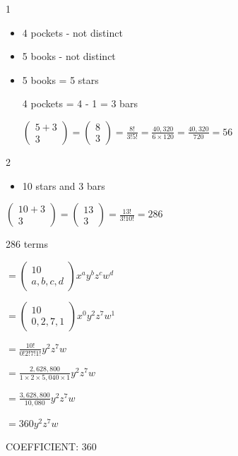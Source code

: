\documentclass[12 pt]{article}
\begin{document}
    \begin{exercise}{1}
    \hfill

    \begin{itemize}
        \item 4 pockets - not distinct
        \item 5 books - not distinct
        \item 5 books = 5 stars
        
        4 pockets = 4 - 1 = 3 bars

        $\begin{pmatrix}
            5 + 3 \\
            3
        \end{pmatrix} = \begin{pmatrix}
            8 \\
            3
        \end{pmatrix} = \frac{8!}{3!5!} = \frac{40,320}{6 \times 120} = \frac{40,320}{720} = 56$
    \end{itemize}  
    \end{exercise}



    \begin{exercise}{2}
    \hfill

    \begin{itemize}
        \item 10 stars and 3 bars
    \end{itemize}

    $\begin{pmatrix}
        10 + 3 \\
        3
    \end{pmatrix} = \begin{pmatrix}
        13 \\
        3
    \end{pmatrix} = \frac{13!}{3!10!} = 286$

    286 terms

    \hfill

    $= \begin{pmatrix}
        10 \\
        a, b, c, d
    \end{pmatrix}x^a y^b z^c w^d$

    $= \begin{pmatrix}
        10 \\
        0, 2, 7, 1
    \end{pmatrix}x^0 y^2 z^7 w^1$

    $= \frac{10!}{0!2!7!1!} y^2 z^7 w$

    $= \frac{2,628,800}{1 \times 2 \times 5,040 \times 1} y^2 z^7 w$

    $= \frac{3,628,800}{10,080} y^2 z^7 w$

    $= 360 y^2 z^7 w$

    COEFFICIENT: 360
    \end{exercise}
\end{document}
